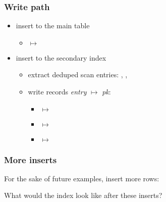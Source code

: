 \begin{frame}
  \titlepage
  \hypertarget{titlePage}{}
\end{frame}

\begin{frame}
  \frametitle{Write path}

  \pause

  \pause

  \begin{itemize}
    \item insert to the main table
      \pause
      \begin{itemize}
        \item {} $\mapsto$ 
      \end{itemize}
      \pause
    \item insert to the secondary index
      \pause
      \begin{itemize}
        \item extract deduped scan entries: , ,
          \pause
        \item write records \emph{entry} $\mapsto$ \emph{pk}:
          \pause
          \begin{itemize}
            \item {} $\mapsto$ 
              \pause
            \item {} $\mapsto$ 
              \pause
            \item {} $\mapsto$ 
          \end{itemize}
      \end{itemize}
  \end{itemize}
\end{frame}

\begin{frame}
  \frametitle{More inserts}
  For the sake of future examples, insert more rows:



  \pause

  What would the index look like after these inserts?
\end{frame}

